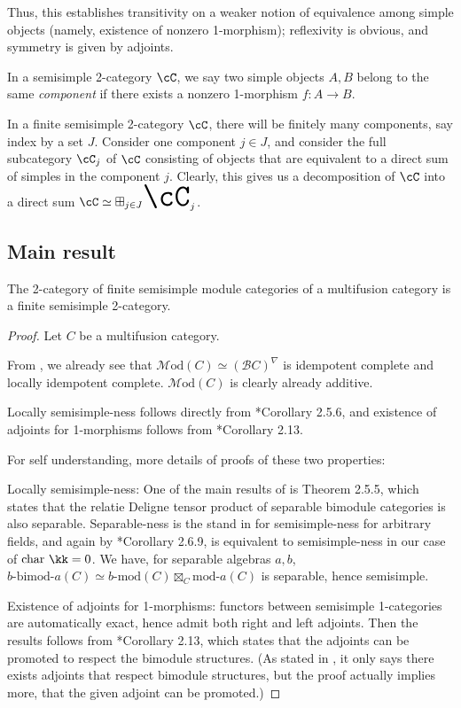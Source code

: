 \documentclass[12pt]{article}
\newcommand{\cB}{{\mathcal{B}}}
\newcommand{\Mod}{{\mathcal{M}\textrm{od}}}
\newcommand{\bigboxplus}{\Huge \boxplus}
\newcommand{\bimod}[2]{{#1\textrm{-bimod-}#2}}
\newcommand{\amod}[1]{{#1\textrm{-mod}}}
\newcommand{\moda}[1]{{\textrm{mod-}#1}}
\newcommand{\ModA}[1]{{\Mod(#1)}}
\begin{document}
Thus, this establishes transitivity on a weaker notion
of equivalence among simple objects
(namely, existence of nonzero 1-morphism);
reflexivity is obvious,
and symmetry is given by adjoints.

\begin{definition}
In a semisimple 2-category $\cC$,
we say two simple objects $A,B$ belong to the same
\emph{component} if there exists a nonzero 1-morphism
$f: A \to B$.
\end{definition}


In a finite semisimple 2-category $\cC$,
there will be finitely many components,
say index by a set $J$.
Consider one component $j \in J$,
and consider the full subcategory $\cC_j$ of $\cC$
consisting of objects that are equivalent
to a direct sum of simples in the component $j$.
Clearly, this gives us a decomposition of $\cC$ into a direct sum
$\cC \simeq \bigboxplus_{j \in J} \cC_j$.


\subsection{Main result}

\begin{theorem}
The 2-category of finite semisimple module categories
of a multifusion category
is a finite semisimple 2-category.
\end{theorem}

\begin{proof}
Let $C$ be a multifusion category.

From ,
we already see that $\ModA{C} \simeq (\cB C)^\nabla$
is idempotent complete
and locally idempotent complete.
$\ModA{C}$ is clearly already additive.


Locally semisimple-ness follows directly from
\cite{DSPSb}*{Corollary 2.5.6},
and existence of adjoints for 1-morphisms
follows from \cite{DSPSa}*{Corollary 2.13}.

For self understanding, more details of proofs of these two
properties:

Locally semisimple-ness:
One of the main results of \cite{DSPSb} is
Theorem 2.5.5, which states that
the relatie Deligne tensor product
of separable bimodule categories is also separable.
Separable-ness is the stand in for semisimple-ness
for arbitrary fields,
and again by \cite{DSPSb}*{Corollary 2.6.9},
is equivalent to semisimple-ness in our case of
$\text{char }\kk = 0$.
We have, for separable algebras $a,b$,
$\bimod{b}{a}(C) \simeq \amod{b}(C) \boxtimes_{C} \moda{a}(C)$
is separable, hence semisimple.

Existence of adjoints for 1-morphisms:
functors between semisimple 1-categories
are automatically exact,
hence admit both right and left adjoints.
Then the results follows from \cite{DSPSa}*{Corollary 2.13},
which states that the adjoints can be promoted
to respect the bimodule structures.
(As stated in \cite{DSPSa}, it only says there
exists adjoints that respect bimodule structures,
but the proof actually implies more,
that the given adjoint can be promoted.)
\end{proof}
\end{document}
